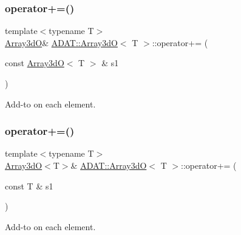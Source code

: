 \subsubsection{\texorpdfstring{operator+=()}{operator+=()}\hspace{0.1cm}{\footnotesize\ttfamily [2/4]}}
{\footnotesize\ttfamily template$<$typename T$>$ \\
\mbox{\hyperlink{classADAT_1_1Array3dO}{Array3dO}}\& \mbox{\hyperlink{classADAT_1_1Array3dO}{A\+D\+A\+T\+::\+Array3dO}}$<$ T $>$\+::operator+= (\begin{DoxyParamCaption}\item[{const \mbox{\hyperlink{classADAT_1_1Array3dO}{Array3dO}}$<$ T $>$ \&}]{s1 }\end{DoxyParamCaption})\hspace{0.3cm}{\ttfamily [inline]}}



Add-\/to on each element. 

\mbox{\label{classADAT_1_1Array3dO_a6e5f624a1a14555b030d5fb53cb85f9c}} 
\subsubsection{\texorpdfstring{operator+=()}{operator+=()}\hspace{0.1cm}{\footnotesize\ttfamily [3/4]}}
{\footnotesize\ttfamily template$<$typename T$>$ \\
\mbox{\hyperlink{classADAT_1_1Array3dO}{Array3dO}}$<$T$>$\& \mbox{\hyperlink{classADAT_1_1Array3dO}{A\+D\+A\+T\+::\+Array3dO}}$<$ T $>$\+::operator+= (\begin{DoxyParamCaption}\item[{const T \&}]{s1 }\end{DoxyParamCaption})\hspace{0.3cm}{\ttfamily [inline]}}



Add-\/to on each element. 

\mbox{\label{classADAT_1_1Array3dO_a6e5f624a1a14555b030d5fb53cb85f9c}} 
